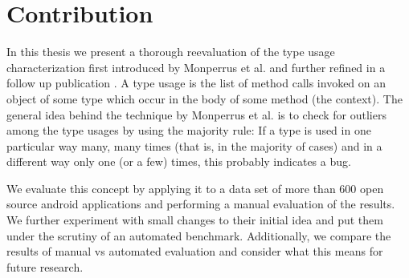 

\section{Contribution}

In this thesis we present a thorough reevaluation of the type usage characterization first introduced by Monperrus et al.\cite{monperrus2010detecting} and further refined in a follow up publication \cite{monperrus2013detecting}.
A type usage is the list of method calls invoked on an object of some type which occur in the body of some method (the context).
The general idea behind the technique by Monperrus et al. is to check for outliers among the type usages by using the majority rule:
If a type is used in one particular way many, many times (that is, in the majority of cases) and in a different way only one (or a few) times, this probably indicates a bug.

We evaluate this concept by applying it to a data set of more than 600 open source android applications and performing a manual evaluation of the results.
We further experiment with small changes to their initial idea and put them under the scrutiny of an automated benchmark.
Additionally, we compare the results of manual vs automated evaluation and consider what this means for future research.


